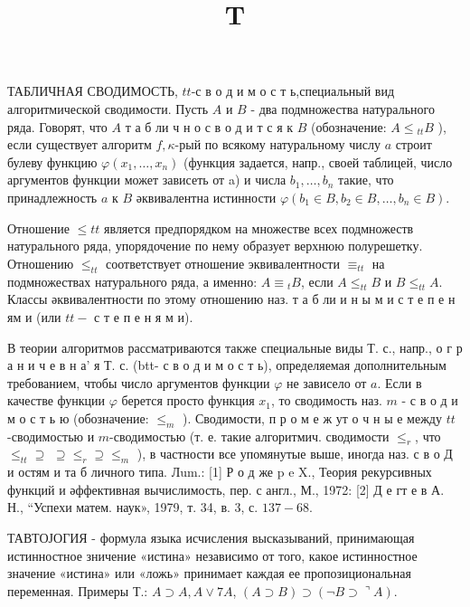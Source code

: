 \documentclass[10pt]{article}
\title{$\mathbf{T}$ }
\author{}
\date{}
\begin{document}
\maketitle

ТАБЛИЧНАЯ СВОДИМОСТЬ, $t t$-с в о д и м о с т ь,специальный вид алгоритмической сводимости. Пусть $A$ и $B$ - два подмножества натурального ряда. Говорят, что $A$ т а б ли ч н о с в о д и т с я к $B$ (обозначение: $A \leqslant{ }_{t t} B$ ), если существует алгоритм $f, \kappa$-рый по всякому натуральному числу $a$ строит булеву функцию $\varphi\left(x_{1}, \ldots, x_{n}\right)$ (функция задается, напр., своей таблицей, число аргументов функции может зависеть от a) и числа $b_{1}, \ldots, b_{n}$ такие, что принадлежность $a$ к $B$ әквивалентна истинности $\varphi\left(b_{1} \in B, b_{2} \in B, \ldots, b_{n} \in B\right)$.



Отношение $\leqslant t t$ является предпорядком на множестве всех подмножеств натурального ряда, упорядочение по нему образует верхнюю полурешетку. Отношению $\leqslant_{t t}$ соответствует отношение эквивалентности $\equiv_{t t}$ на подмножествах натурального ряда, а именно: $A \equiv{ }_{t} B$, если $A \leqslant_{t t} B$ и $B \leqslant_{t t} A$. Классы әквивалентности по этому отношению наз. т а б ли и н ы м и с т е п е н ям и (или $t t-$ с т е п е н я м и).



В теории алгоритмов рассматриваются также специальные виды Т. с., напр., о г р а н и ч е в н а' я Т. с. (btt- с в о д и м о с т ь), определяемая дополнительным требованием, чтобы число аргументов функции $\varphi$ не зависело от $a$. Если в качестве функции $\varphi$ берется просто функция $x_{1}$, то сводимость наз. $m$ - с в о д и м о с т ь ю (обозначение: $\leqslant_{m}$ ). Сводимости, п р о м е ж ут о ч н ы е между $t t$-сводимостью и $m$-сводимостью (т. е. такие алгоритмич. сводимости $\leqslant_{r}$, что $\leqslant_{t t} \supseteq$ $\supseteq \leqslant_{r} \supseteq \leqslant_{m}$ ), в частности все упомянутые выше, иногда наз. с в о Д и остям и та б личного типа. Лum.: [1] Р о д же p e X., Теория рекурсивных функций и әффективная вычислимость, пер. с англ., М., 1972: [2] Д е гт е в А. Н., “Успехи матем. наук», 1979, т. 34, в. 3, с. $137-68$.



ТАВТОЈОГИЯ - формула языка исчисления высказываний, принимающая истинностное зничение «истина» независимо от того, какое истинностное значение «истина» или «ложь» принимает каждая ее пропозициональная переменная. Примеры Т.: $A \supset A, A \vee 7 A$, $(A \supset B) \supset(\neg B \supset\urcorner A)$.
\end{document}
